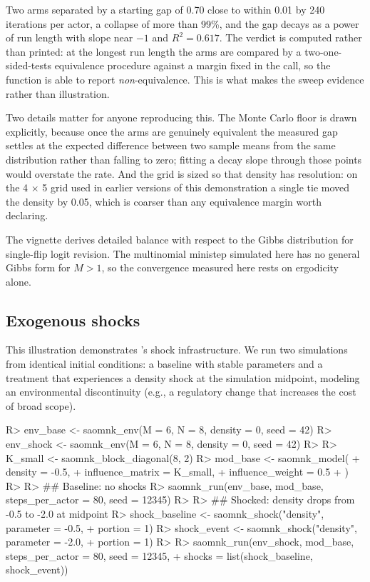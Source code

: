 \documentclass[
  article]{jss}
\begin{document}
Two arms separated by a starting gap of 0.70 close to within 0.01 by 240
iterations per actor, a collapse of more than 99\%, and the gap decays
as a power of run length with slope near \(-1\) and \(R^2 = 0.617\). The
verdict is computed rather than printed: at the longest run length the
arms are compared by a two-one-sided-tests equivalence procedure against
a margin fixed in the call, so the function is able to report
\emph{non}-equivalence. This is what makes the sweep evidence rather
than illustration.

Two details matter for anyone reproducing this. The Monte Carlo floor is
drawn explicitly, because once the arms are genuinely equivalent the
measured gap settles at the expected difference between two sample means
from the same distribution rather than falling to zero; fitting a decay
slope through those points would overstate the rate. And the grid is
sized so that density has resolution: on the 4 \(\times\) 5 grid used in
earlier versions of this demonstration a single tie moved the density by
0.05, which is coarser than any equivalence margin worth declaring.

The vignette derives detailed balance with respect to the Gibbs
distribution for single-flip logit revision. The multinomial ministep
simulated here has no general Gibbs form for \(M > 1\), so the
convergence measured here rests on ergodicity alone.

\subsection{Exogenous shocks}\label{sec:shocks}

This illustration demonstrates 's shock infrastructure.
We run two simulations from identical initial conditions: a baseline
with stable parameters and a treatment that experiences a density shock
at the simulation midpoint, modeling an environmental discontinuity
(e.g., a regulatory change that increases the cost of broad scope).

\begin{CodeChunk}
\begin{CodeInput}
R> env_base <- saomnk_env(M = 6, N = 8, density = 0, seed = 42)
R> env_shock <- saomnk_env(M = 6, N = 8, density = 0, seed = 42)
R> 
R> K_small <- saomnk_block_diagonal(8, 2)
R> mod_base <- saomnk_model(
+   density = -0.5,
+   influence_matrix = K_small,
+   influence_weight = 0.5
+ )
R> 
R> ## Baseline: no shocks
R> saomnk_run(env_base, mod_base, steps_per_actor = 80, seed = 12345)
R> 
R> ## Shocked: density drops from -0.5 to -2.0 at midpoint
R> shock_baseline <- saomnk_shock("density", parameter = -0.5,
+                                portion = 1)
R> shock_event    <- saomnk_shock("density", parameter = -2.0,
+                                portion = 1)
R> 
R> saomnk_run(env_shock, mod_base, steps_per_actor = 80, seed = 12345,
+            shocks = list(shock_baseline, shock_event))
\end{CodeInput}
\end{CodeChunk}
\end{document}
